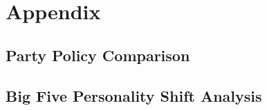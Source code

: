\appendix

\chapter{Appendix}\label{appendix}

\section{Party Policy Comparison}\label{appendix:party_policies}


\newpage
\section{Big Five Personality Shift Analysis}\label{appendix:paired_stats}


